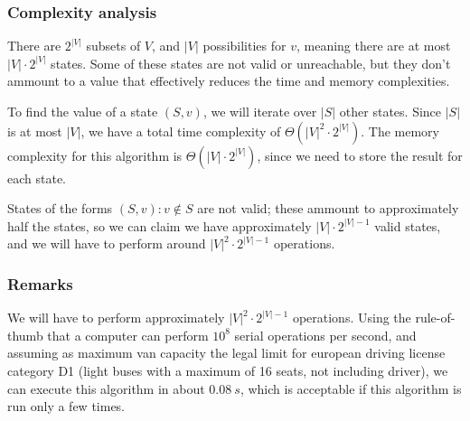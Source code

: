 \subsubsection{Complexity analysis}
There are $2^{|V|}$ subsets of $V$, and $|V|$ possibilities for $v$, meaning there are at most $|V| \cdot 2^{|V|}$ states. Some of these states are not valid or unreachable, but they don't ammount to a value that effectively reduces the time and memory complexities.\par
To find the value of a state $(S,v)$, we will iterate over $|S|$ other states. Since $|S|$ is at most $|V|$, we have a total time complexity of $\Theta (|V|^2 \cdot 2^{|V|})$. The memory complexity for this algorithm is $\Theta (|V| \cdot 2^{|V|})$, since we need to store the result for each state.\par
States of the forms $(S, v)\colon v \not \in S$ are not valid; these ammount to approximately half the states, so we can claim we have approximately $|V|\cdot 2^{|V|-1}$ valid states, and we will have to perform around $|V|^2\cdot 2^{|V|-1}$ operations.\par
\subsubsection{Remarks}
We will have to perform approximately $|V|^2\cdot 2^{|V|-1}$ operations. Using the rule-of-thumb that a computer can perform $10^8$ serial operations per second, and assuming as maximum van capacity the legal limit for european driving license category D1 (light buses with a maximum of 16 seats, not including driver)\cite{dir-2006-126-ec}, we can execute this algorithm in about $\SI{0.08}{s}$, which is acceptable if this algorithm is run only a few times.
